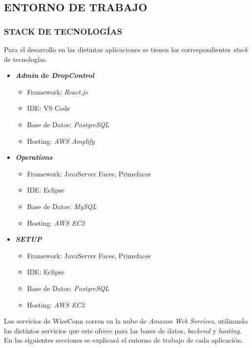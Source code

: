 \subsection{ENTORNO DE TRABAJO}

\subsubsection{STACK DE TECNOLOGÍAS}

Para el desarrollo en las distintas aplicaciones se tienen los correspondientes \textit{stack} de tecnologías.

\begin{itemize}
    \item \textbf{\textit{Admin} de \textit{DropControl}}
    \begin{itemize}
        \item Framework: \textit{React.js}
        \item IDE: VS Code
        \item Base de Datos: \textit{PostgreSQL}
        \item Hosting: \textit{AWS Amplify}
    \end{itemize}
    \item \textbf{\textit{Operations}}
    \begin{itemize}
        \item Framework: JavaServer Faces, Primefaces
        \item IDE: Eclipse
        \item Base de Datos: \textit{MySQL}
        \item Hosting: \textit{AWS EC2}
    \end{itemize}
    \item \textbf{\textit{SETUP}}
    \begin{itemize}
        \item Framework: JavaServer Faces, Primefaces
        \item IDE: Eclipse
        \item Base de Datos: \textit{PostgreSQL}
        \item Hosting: \textit{AWS EC2}
    \end{itemize}
\end{itemize}
\iffalse
Los servicios de WiseConn corren en la nube de \textit{Amazon Web Services}, utilizando los distintos servicios que este ofrece para las bases de datos, \textit{backend} y \textit{hosting}. En las siguientes secciones se explicará el entorno de trabajo de cada aplicación.

